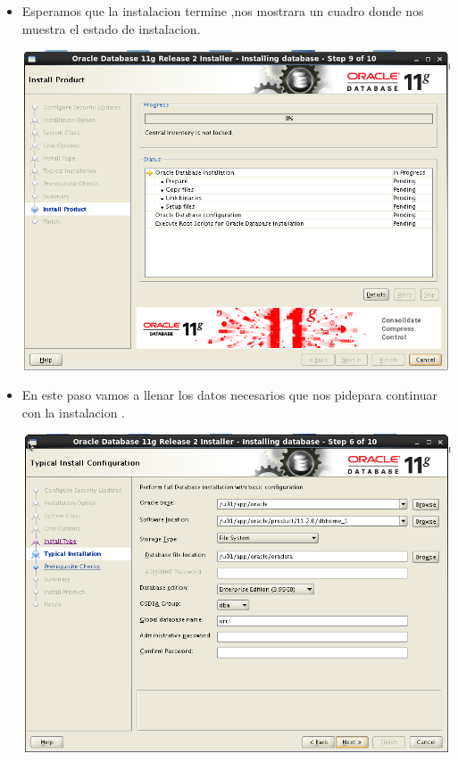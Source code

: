 \begin{itemize}
	
\newpage

	\item Esperamos que la instalacion termine ,nos mostrara un cuadro donde nos muestra el estado de instalacion.
	\begin{center}
	\includegraphics[width=13cm]{./Imagenes/img55} 
	\end{center}
	
	\item En este paso vamos a llenar los datos necesarios que nos pidepara continuar con la instalacion .
	\begin{center}
	\includegraphics[width=13cm]{./Imagenes/img56} 
	\end{center}
	
	
\newpage


\end{itemize}
